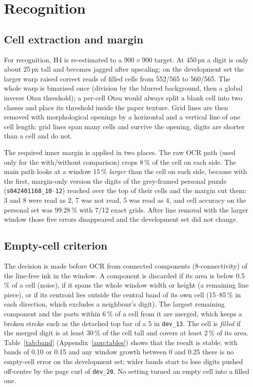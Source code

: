 \documentclass[conference]{IEEEtran}
\begin{document}
\section{Recognition}
\label{sec:recog}
\subsection{Cell extraction and margin}
For recognition, H4 is re-estimated to a $900\times900$ target. At 450\,px a digit is only about 25\,px tall and becomes jagged after upscaling; on the development set the larger warp raised correct reads of filled cells from 552/565 to 560/565. The whole warp is binarised once (division by the blurred background, then a global inverse Otsu threshold); a per-cell Otsu would always split a blank cell into two classes and place its threshold inside the paper texture. Grid lines are then removed with morphological openings by a horizontal and a vertical line of one cell length: grid lines span many cells and survive the opening, digits are shorter than a cell and do not.

The required inner margin is applied in two places. The raw OCR path (used only for the with/without comparison) crops 8\,\% of the cell on each side. The main path looks at a window 15\,\% \emph{larger} than the cell on each side, because with the first, margin-only version the digits of the grey-framed personal puzzle (\texttt{s042401168\_10}--\texttt{12}) reached over the top of their cells and the margin cut them: 3 and 8 were read as 2, 7 was not read, 5 was read as 4, and cell accuracy on the personal set was 99.28\,\% with 7/12 exact grids. After line removal with the larger window those five errors disappeared and the development set did not change.

\subsection{Empty-cell criterion}
The decision is made before OCR from connected components (8-connectivity) of the line-free ink in the window. A component is discarded if its area is below 0.5\,\% of a cell (noise), if it spans the whole window width or height (a remaining line piece), or if its centroid lies outside the central band of its own cell (15--85\,\% in each direction, which excludes a neighbour's digit). The largest remaining component and the parts within 6\,\% of a cell from it are merged, which keeps a broken stroke such as the detached top bar of a 5 in \texttt{dev\_13}. The cell is \emph{filled} if the merged digit is at least 30\,\% of the cell tall and covers at least 2\,\% of its area. Table~\ref{tab:band} (Appendix~\ref{app:tables}) shows that the result is stable: with bands of 0.10 or 0.15 and any window growth between 0 and 0.25 there is no empty-cell error on the development set; wider bands start to lose digits pushed off-centre by the page curl of \texttt{dev\_20}. No setting turned an empty cell into a filled one.
\end{document}

